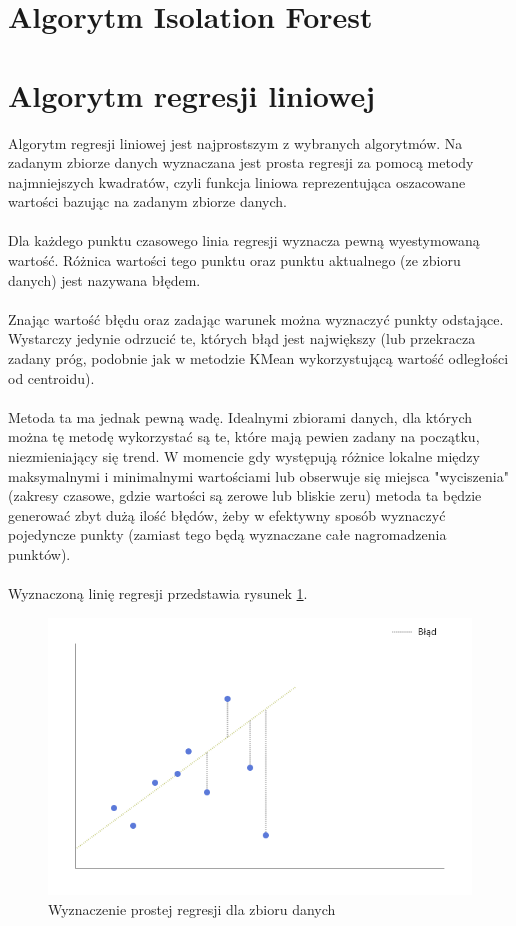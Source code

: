 \documentclass[eng,printmode]{mgr}
\begin{document}
\section{Algorytm Isolation Forest}

\section{Algorytm regresji liniowej}
Algorytm regresji liniowej jest najprostszym z wybranych algorytmów. Na zadanym zbiorze danych wyznaczana jest prosta regresji za pomocą metody najmniejszych kwadratów, czyli funkcja liniowa reprezentująca oszacowane wartości bazując na zadanym zbiorze danych. 
\\\\
Dla każdego punktu czasowego linia regresji wyznacza pewną wyestymowaną wartość. Różnica wartości tego punktu oraz punktu aktualnego (ze zbioru danych) jest nazywana błędem.
\\\\
Znając wartość błędu oraz zadając warunek można wyznaczyć punkty odstające. Wystarczy jedynie odrzucić te, których błąd jest największy (lub przekracza zadany próg, podobnie jak w metodzie KMean wykorzystującą wartość odległości od centroidu).
\\\\
Metoda ta ma jednak pewną wadę. Idealnymi zbiorami danych, dla których można tę metodę wykorzystać są te, które mają pewien zadany na początku, niezmieniający się trend. W momencie gdy występują różnice lokalne między maksymalnymi i minimalnymi wartościami lub obserwuje się miejsca "wyciszenia" (zakresy czasowe, gdzie wartości są zerowe lub bliskie zeru) metoda ta będzie generować zbyt dużą ilość błędów, żeby w efektywny sposób wyznaczyć pojedyncze punkty (zamiast tego będą wyznaczane całe nagromadzenia punktów).
\\\\
Wyznaczoną linię regresji przedstawia rysunek \ref{fig:linear_reg}.

\begin{figure}[H]
  \begin{center}
  \includegraphics[scale=0.7]{linear_reg}
  \end{center}
  \caption{Wyznaczenie prostej regresji dla zbioru danych}
  \label{fig:linear_reg}
\end{figure}
\end{document}
